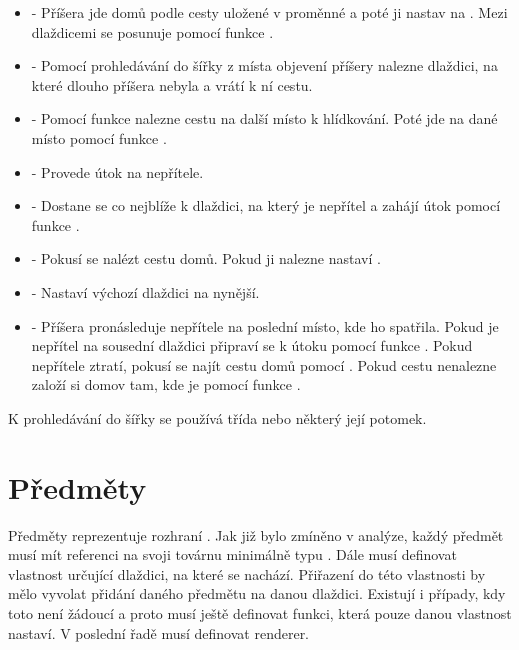 \begin{itemize}
\item {} - Příšera jde domů podle cesty uložené v proměnné  a poté ji nastav na . 
         Mezi dlaždicemi se posunuje pomocí funkce .

\item {} - Pomocí prohledávání do šířky z místa objevení příšery nalezne dlaždici, na které dlouho
příšera nebyla a vrátí k ní cestu.

\item {} - Pomocí funkce  nalezne cestu na další místo k hlídkování. Poté jde na dané místo
 pomocí funkce .

\item {} - Provede útok na nepřítele.

\item {} - Dostane se co nejblíže k dlaždici, na který je nepřítel a zahájí útok pomocí funkce .

\item {} - Pokusí se nalézt cestu domů. Pokud ji nalezne nastaví .

\item {} - Nastaví výchozí dlaždici na nynější.

\item {} - Příšera pronásleduje nepřítele na poslední místo, kde ho spatřila. Pokud je nepřítel na sousední dlaždici připraví
se k útoku pomocí funkce . Pokud nepřítele ztratí, pokusí se najít cestu domů pomocí . Pokud
cestu nenalezne založí si domov tam, kde je pomocí funkce .

\end{itemize}

K prohledávání do šířky se používá třída  nebo některý její potomek. 

\section{Předměty}
Předměty reprezentuje rozhraní . Jak již bylo zmíněno v analýze, každý předmět musí mít referenci na svoji 
továrnu minimálně typu . Dále musí definovat vlastnost určující dlaždici, na které se nachází. 
Přiřazení do této vlastnosti by mělo vyvolat přidání daného předmětu na danou dlaždici. Existují i případy, kdy toto není 
žádoucí a proto musí ještě definovat funkci, která pouze danou vlastnost nastaví. V poslední řadě musí definovat renderer.

